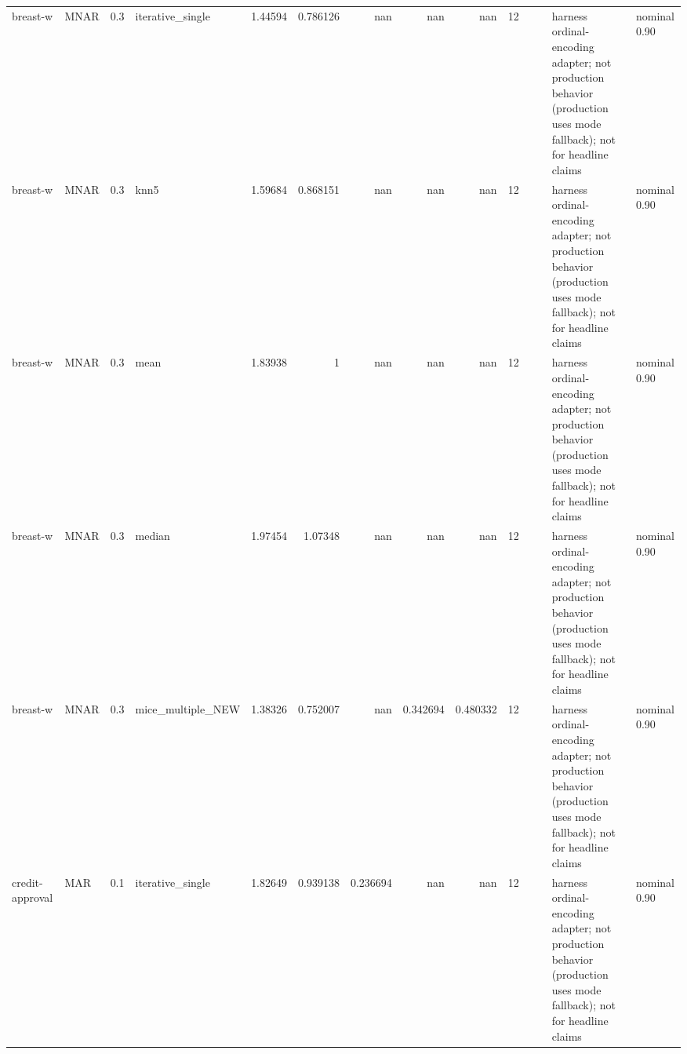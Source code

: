 \begin{table}[ht]
\begin{tabular}{llrlrrrrrrllll}
 breast-w             & MNAR        &         0.3 & iterative\_single  &       1.44594  &             0.786126 &               nan        &                     nan        &                       nan        &        12 &                    &                                         & harness ordinal-encoding adapter; not production behavior (production uses mode fallback); not for headline claims & nominal 0.90              \\
 breast-w             & MNAR        &         0.3 & knn5              &       1.59684  &             0.868151 &               nan        &                     nan        &                       nan        &        12 &                    &                                         & harness ordinal-encoding adapter; not production behavior (production uses mode fallback); not for headline claims & nominal 0.90              \\
 breast-w             & MNAR        &         0.3 & mean              &       1.83938  &             1        &               nan        &                     nan        &                       nan        &        12 &                    &                                         & harness ordinal-encoding adapter; not production behavior (production uses mode fallback); not for headline claims & nominal 0.90              \\
 breast-w             & MNAR        &         0.3 & median            &       1.97454  &             1.07348  &               nan        &                     nan        &                       nan        &        12 &                    &                                         & harness ordinal-encoding adapter; not production behavior (production uses mode fallback); not for headline claims & nominal 0.90              \\
 breast-w             & MNAR        &         0.3 & mice\_multiple\_NEW &       1.38326  &             0.752007 &               nan        &                       0.342694 &                         0.480332 &        12 &                    &                                         & harness ordinal-encoding adapter; not production behavior (production uses mode fallback); not for headline claims & nominal 0.90              \\
 credit-approval      & MAR         &         0.1 & iterative\_single  &       1.82649  &             0.939138 &                 0.236694 &                     nan        &                       nan        &        12 &                    &                                         & harness ordinal-encoding adapter; not production behavior (production uses mode fallback); not for headline claims & nominal 0.90              \\

\end{tabular}
\end{table}
